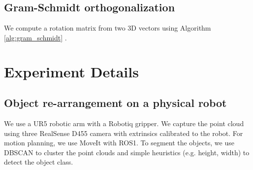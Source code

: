 \documentclass{article}
\begin{document}




\subsection{Gram-Schmidt orthogonalization}

We compute a rotation matrix from two 3D vectors using Algorithm \ref{alg:gram_schmidt} \cite{park22learning}.



\section{Experiment Details}
\label{appendix:experiment}

\subsection{Object re-arrangement on a physical robot}
\label{appendix:experiment:rearrangement}

We use a UR5 robotic arm with a Robotiq gripper. We capture the point cloud using three RealSense D455 camera with extrinsics calibrated to the robot. For motion planning, we use MoveIt with ROS1. To segment the objects, we use DBSCAN to cluster the point clouds and simple heuristics (e.g. height, width) to detect the object class.
\end{document}
